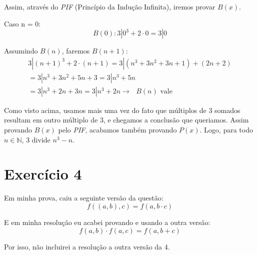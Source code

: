 \documentclass{article}
\begin{document}
    Assim, através do \emph{PIF} (Princípio da Indução Infinita), iremos
    provar $B(x)$.

    Caso n = 0:
    \begin{equation*}
        B(0): 3|0^3 + 2\cdot 0 = 3|0 
    \end{equation*}

    Assumindo $B(n)$, faremos $B(n+1)$:
    \begin{equation*}
        \begin{aligned}
            3|(n+1)^3 + 2\cdot (n+1) = 3|(n^3 + 3n^2 + 3n + 1) +
            (2n + 2) \\
            = 3|n^3 + 3n^2 + 5n + 3 = 3|n^3 + 5n \\
            = 3|n^3 + 2n + 3n = 3|n^3 + 2n \rightarrow
            \text{ $B(n)$ vale}
        \end{aligned}
    \end{equation*}

    Como visto acima, usamos mais uma vez do fato que múltiplos 
    de $3$ somados resultam em outro múltiplo de $3$, e chegamos
    a conclusão que queriamos. Assim provando $B(x)$ pelo
    \emph{PIF}, acabamos também provando $P(x)$. Logo, para todo
    $n\in\mathbb{N}$, $3$ divide $n^3 - n$.

    \section[Observação]{Exercício 4}
    Em minha prova, caiu a seguinte versão da questão:
    \begin{equation*}
        f((a,b),c) = f(a,b\cdot c)
    \end{equation*}
    
    E em minha resolução eu acabei provando e usando a outra
    versão:
    \begin{equation*}
        f(a,b)\cdot f(a,c) = f(a,b+c)
    \end{equation*}

    Por isso, não incluirei a resolução a outra versão da 4.
\end{document}
